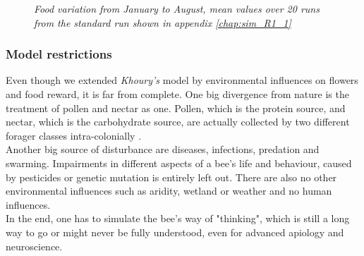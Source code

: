 		\begin{figure}[H]
			\centering
			\caption{\textit{Food variation from January to August, mean values over 20 runs from the standard run shown in appendix \ref{chap:sim_R1_1} }}
			\label{fig:foodVariation}
		\end{figure}
	
	\subsubsection{Model restrictions}
		\label{chap:modelRestrictions}
		Even though we extended \textit{Khoury's} model by environmental influences on flowers and food reward, it is far from complete. One big divergence from nature is the treatment of pollen and nectar as one. Pollen, which is the protein source, and nectar, which is the carbohydrate source, are actually collected by two different forager classes intra-colonially \cite{schmickl07}.\\  Another big source of disturbance are diseases, infections, predation and swarming. Impairments in different aspects of a bee's life and behaviour, caused by pesticides or genetic mutation is entirely left out. There are also no other environmental influences such as aridity, wetland or weather and no human influences. \\
		In the end, one has to simulate the bee's way of "thinking", which is still a long way to go or might never be fully understood, even for advanced apiology and neuroscience.
		
	
